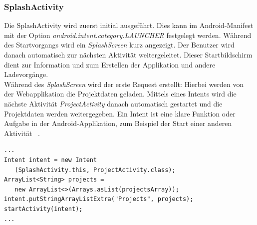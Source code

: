 \subsubsection{SplashActivity}
Die SplashActivity wird zuerst initial ausgeführt. Dies kann im Android-Manifest mit der Option \textit{android.intent.category.LAUNCHER} festgelegt werden. Während des Startvorgangs wird ein \textit{SplashScreen} kurz angezeigt. Der Benutzer wird danach automatisch zur nächsten Aktivität weitergeleitet. Dieser Startbildschirm dient zur Information und zum Erstellen der Applikation und andere Ladevorgänge. \\ Während des \textit{SplashScreen} wird der erste Request erstellt: Hierbei werden von der Webapplikation die Projektdaten geladen. Mittels eines Intents wird die nächste Aktivität \textit{ProjectActivity} danach automatisch gestartet und die Projektdaten werden weitergegeben. Ein Intent ist eine klare Funktion oder Aufgabe in der Android-Applikation, zum Beispiel der Start einer anderen Aktivität ~\parencite{vogelIntent}.
\lstset{
  caption=[Starten einer neuen Aktivität.]{Listing für die Erstellung eines neuen Intents, für den Wechsel der \textit{Activity} zur \textit{ProjectActivity}. Im Intent werden die geladenen Projektnamen hinzugefügt und in der neuen \textit{Activity} ausgelesen.},
  basicstyle=\small\ttfamily, 
  label=lst:config, 
  language=Java,
  frame=single,
  breaklines=true, %
  postbreak=\mbox{\textcolor{red}{$\hookrightarrow$}\space},
}

\begin{samepage}%
	\begin{lstlisting}[float=tbhp]
...
Intent intent = new Intent
   (SplashActivity.this, ProjectActivity.class);
ArrayList<String> projects = 
   new ArrayList<>(Arrays.asList(projectsArray));
intent.putStringArrayListExtra("Projects", projects);
startActivity(intent);
...  

	\end{lstlisting}
\end{samepage}
